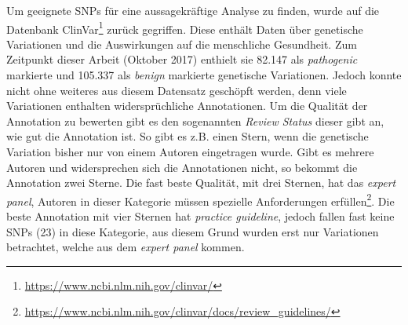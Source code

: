 Um geeignete \ac{SNP}s für eine aussagekräftige Analyse zu finden, wurde auf die Datenbank ClinVar\footnote{\url{https://www.ncbi.nlm.nih.gov/clinvar/}} zurück gegriffen. Diese enthält Daten über genetische Variationen und die Auswirkungen auf die menschliche Gesundheit. Zum Zeitpunkt dieser Arbeit (Oktober 2017) enthielt sie 82.147 als \emph{pathogenic} markierte und 105.337 als \emph{benign} markierte genetische Variationen. Jedoch konnte nicht ohne weiteres aus diesem Datensatz geschöpft werden, denn viele Variationen enthalten widersprüchliche Annotationen. Um die Qualität der Annotation zu bewerten gibt es den sogenannten \emph{Review Status} dieser gibt an, wie gut die Annotation ist. So gibt es z.B. einen Stern, wenn die genetische Variation bisher nur von einem Autoren eingetragen wurde. Gibt es mehrere Autoren und widersprechen sich die Annotationen nicht, so bekommt die Annotation zwei Sterne. Die fast beste Qualität, mit drei Sternen, hat das \emph{expert panel}, Autoren in dieser Kategorie müssen spezielle Anforderungen erfüllen\footnote{\url{https://www.ncbi.nlm.nih.gov/clinvar/docs/review_guidelines/}}. Die beste Annotation mit vier Sternen hat \emph{practice guideline}, jedoch fallen fast keine \ac{SNP}s (23) in diese Kategorie, aus diesem Grund wurden erst nur Variationen betrachtet, welche aus dem \emph{expert panel} kommen. 
%
\begin{table}[]
    \centering
    \caption{Tabelle aller Gene des \emph{expert panels} mit mindestens 10 Pathogenen \ac{SNP}s. Die verwendeten Gene sind grün markiert.}
    \label{tab:expert_snps}
\end{table}

